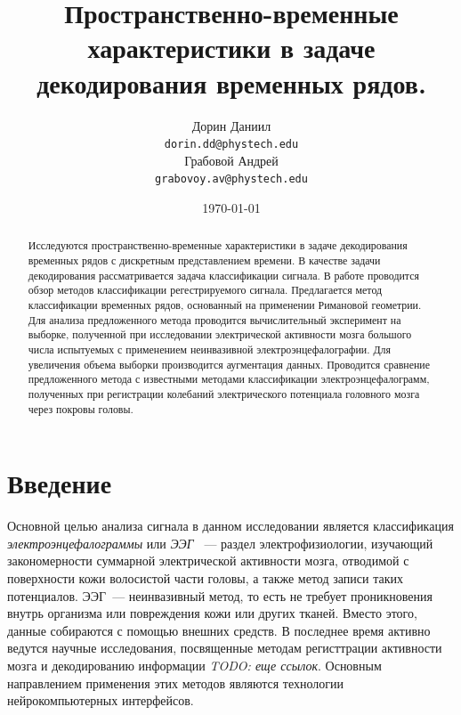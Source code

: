 \documentclass[a4paper, 12pt]{extarticle}
\title{Пространственно-временные характеристики в задаче декодирования временных рядов.}
\author{
	Дорин Даниил \\
	\texttt{dorin.dd@phystech.edu} \\
	\And
	Грабовой Андрей \\
	\texttt{grabovoy.av@phystech.edu}
}
\date{\today}
\begin{document}
\maketitle

\begin{abstract}

	Исследуются пространственно-временные характеристики в задаче декодирования временных рядов с дискретным представлением времени.
	В качестве задачи декодирования рассматривается задача классификации сигнала. 
	В работе проводится обзор методов классификации регестрируемого сигнала. 
	Предлагается метод классификации временных рядов, основанный на применении Римановой геометрии. 
	Для анализа предложенного метода проводится вычислительный эксперимент на выборке, 
	полученной при исследовании электрической активности мозга большого числа испытуемых с применением неинвазивной электроэнцефалографии. 
	Для увеличения объема выборки производится аугментация данных. 
	Проводится сравнение предложенного метода с известными методами классификации электроэнцефалограмм, полученных при регистрации колебаний электрического 
	потенциала головного мозга через покровы головы.

\end{abstract}


\section{Введение}

\indent Основной целью анализа сигнала в данном исследовании является 
классификация \textit{электроэнцефалограммы} или \textit{ЭЭГ} \citep{teplan2002fundamentals, beniczky2020electroencephalography}~--- раздел электрофизиологии, 
изучающий закономерности суммарной электрической активности мозга, 
отводимой с поверхности кожи волосистой части головы, 
а также метод записи таких потенциалов. ЭЭГ~--- неинвазивный метод, то есть 
не требует проникновения внутрь организма или повреждения кожи или других тканей. 
Вместо этого, данные собираются с помощью внешних средств. 
В последнее время активно ведутся научные исследования, 
посвященные методам регисттрации активности мозга и декодированию 
информации \citep{siuly2016eeg} \textit{TODO: еще ссылок}. Основным направлением применения 
этих методов являются технологии нейрокомпьютерных интерфейсов.
\end{document}
